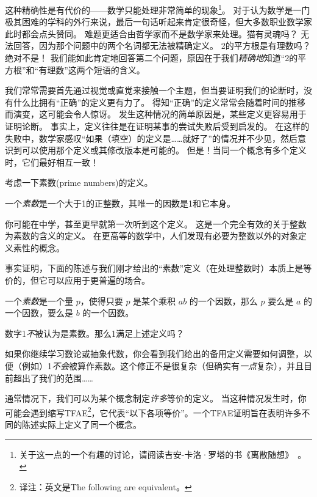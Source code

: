 这种精确性是有代价的——数学只能处理非常简单的现象\footnote{关于这一点的一个有趣的讨论，请阅读吉安-卡洛·罗塔的书《离散随想》~\cite{rota}。}。
对于认为数学是一门极其困难的学科的外行来说，最后一句话听起来肯定很奇怪，但大多数职业数学家此时都会点头赞同。
难题更适合由哲学家而不是数学家来处理。猫有灵魂吗？
无法回答，因为那个问题中的两个名词都无法被精确定义。
2的平方根是有理数吗？绝对不是！
我们能如此肯定地回答第二个问题，原因在于我们{\em 精确地}知道“2的平方根”和“有理数”这两个短语的含义。

我们常常需要首先通过视觉或直觉来接触一个主题，但当要证明我们的论断时，没有什么比拥有“正确”的定义更有力了。
得知“正确”的定义常常会随着时间的推移而演变，这可能会令人惊讶。
发生这种情况的简单原因是，某些定义更容易用于证明论断。
事实上，定义往往是在证明某事的尝试失败后受到启发的。
在这样的失败中，数学家感叹“如果（填空）的定义是……就好了”的情况并不少见，然后意识到可以使用那个定义或其修改版本是可能的。
但是！当同一个概念有多个定义时，它们最好相互一致！


考虑一下素数(prime numbers)的定义。

\begin{defi}
  一个{\em 素数}是一个大于1的正整数，其唯一的因数是1和它本身。
\end{defi}

你可能在中学，甚至更早就第一次听到这个定义。
这是一个完全有效的关于整数为素数的含义的定义。
在更高等的数学中，人们发现有必要为整数以外的对象定义素性的概念。

事实证明，下面的陈述与我们刚才给出的“素数”定义（在处理整数时）本质上是等价的，但它可以应用于更普遍的场合。

\begin{defi}
  一个{\em 素数}是一个量 $p$，使得只要 $p$ 是某个乘积 $ab$ 的一个因数，那么 $p$ 要么是 $a$ 的一个因数，要么是 $b$ 的一个因数。
\end{defi}

\begin{exer}
  数字1{\em 不}被认为是素数。那么1满足上述定义吗？
\end{exer}

如果你继续学习数论或抽象代数，你会看到我们给出的备用定义需要如何调整，以便（例如）1\emph{不会}被算作素数。这个修正不是很复杂（但确实有{\em 一点}复杂），并且目前超出了我们的范围……

通常情况下，我们可以为某个概念制定{\em 许多}等价的定义。
当这种情况发生时，你可能会遇到缩写TFAE\footnote{译注：英文是The following are equivalent。}，它代表“以下各项等价”。一个TFAE证明旨在表明许多不同的陈述实际上定义了同一个概念。

